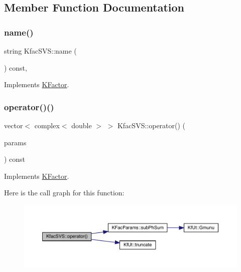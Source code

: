 \subsection{Member Function Documentation}
\mbox{\label{classKfacSVS_af7a1fd20af79d6a2f844cf4418a5eeb8}} 
\subsubsection{\texorpdfstring{name()}{name()}}
{\footnotesize\ttfamily string Kfac\+S\+V\+S\+::name (\begin{DoxyParamCaption}{ }\end{DoxyParamCaption}) const\hspace{0.3cm}{\ttfamily [inline]}, {\ttfamily [virtual]}}



Implements \mbox{\hyperlink{classKFactor_ae578f8d6e4b525895427717da99cab6c}{K\+Factor}}.

\mbox{\label{classKfacSVS_a1bcfae29380c602c7040ad790ccff63f}} 
\subsubsection{\texorpdfstring{operator()()}{operator()()}}
{\footnotesize\ttfamily vector$<$ complex$<$ double $>$ $>$ Kfac\+S\+V\+S\+::operator() (\begin{DoxyParamCaption}\item[{const \mbox{\hyperlink{classKFacParams}{K\+Fac\+Params}} \&}]{params }\end{DoxyParamCaption}) const\hspace{0.3cm}{\ttfamily [virtual]}}



Implements \mbox{\hyperlink{classKFactor_a012aae9ff4a07eab86d5d50b7f774285}{K\+Factor}}.

Here is the call graph for this function\+:
\nopagebreak
\begin{figure}[H]
\begin{center}
\leavevmode
\includegraphics[width=350pt]{d0/dde/classKfacSVS_a1bcfae29380c602c7040ad790ccff63f_cgraph}
\end{center}
\end{figure}


